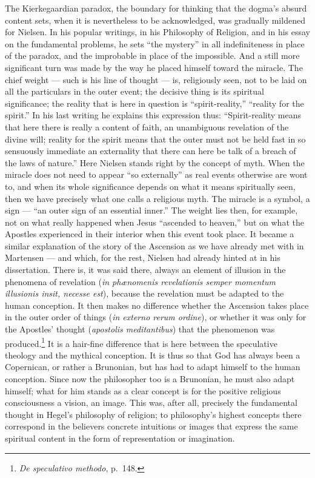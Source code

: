 \documentclass[12pt,a4paper]{book}
\newcommand{\opage}[1]{\marginnote{\footnotesize\textit{[#1]}}}
\begin{document}
The Kierkegaardian paradox, the boundary for thinking that the dogma's absurd content sets, when
it is nevertheless to be acknowledged, was gradually mildened for Nielsen. In his popular
writings, in his Philosophy of Religion, and in his essay on the fundamental problems, he sets
``the mystery'' in all indefiniteness in place of the paradox, and the improbable in place of
the impossible. And a still more significant turn was made by the way he placed himself toward
the miracle. The chief weight --- such is his line of thought --- is, religiously seen, not to
be laid on all the particulars in the outer event; the decisive thing is its spiritual
significance; the reality that is here in question is ``spirit-reality,'' ``reality for the
spirit.'' In his last writing he explains this expression thus: ``Spirit-reality means that here
there is really a content of faith, an unambiguous revelation of the divine will; \opage{193}reality for
the spirit means that the outer must not be held fast in so sensuously immediate an externality
that there can here be talk of a breach of the laws of nature.'' Here Nielsen stands right by the
concept of myth. When the miracle does not need to appear ``so externally'' as real events
otherwise are wont to, and when its whole significance depends on what it means spiritually seen,
then we have precisely what one calls a religious myth. The miracle is a symbol, a sign --- ``an
outer sign of an essential inner.'' The weight lies then, for example, not on what really
happened when Jesus ``ascended to heaven,'' but on what the Apostles experienced in their
interior when this event took place. It became a similar explanation of the story of the
Ascension as we have already met with in Martensen --- and which, for the rest, Nielsen had
already hinted at in his dissertation. There is, it was said there, always an element of illusion
in the phenomena of revelation (\emph{in phænomenis revelationis semper momentum illusionis
insit, necesse est}), because the revelation must be adapted to the human conception. It then
makes no difference whether the Ascension takes place in the outer order of things (\emph{in
externo rerum ordine}), or whether it was only for the Apostles' thought (\emph{apostolis
meditantibus}) that the phenomenon was produced.\footnote{\emph{De speculativo methodo}, p.~148.}
It is a hair-fine difference that is here between the speculative theology and the mythical
conception. It is thus so that God has always been a Copernican, or rather a Brunonian, but has
had to adapt himself to the human conception. Since now the philosopher too is a Brunonian, he
must also adapt himself; what for him stands as a clear concept is for the positive religious
consciousness a vision, an image. This was, after all, precisely the fundamental thought in
Hegel's philosophy of religion; to philosophy's highest concepts there correspond in the
believers concrete intuitions or images that express the same spiritual content in the form of
representation or imagination.
\end{document}
